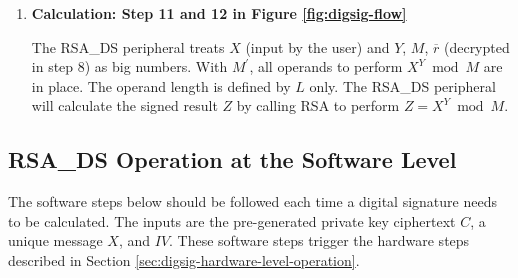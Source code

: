 \documentclass[main\_\_EN.tex]{subfiles}
\begin{document}
\begin{enumerate}
\begin{itemize}
        \end{itemize}

        The RSA\_DS peripheral will only perform subsequent operations if MD check passes. If the padding check fails, a warning is generated, but it does not affect the subsequent operations.

    \item {\bfseries Calculation: Step 11 and 12 in Figure \ref{fig:digsig-flow}}

        The RSA\_DS peripheral treats \begin{math}X\end{math} (input by the user) and \begin{math}Y\end{math}, \begin{math}M\end{math}, \begin{math}\overline{r}\end{math} (decrypted in step 8) as big numbers. With \begin{math}M^{\prime}\end{math}, all operands to perform \begin{math} X^{Y} \bmod M\end{math} are in place. The operand length is defined by \begin{math}L\end{math} only. The RSA\_DS peripheral will calculate the signed result \begin{math}Z\end{math} by calling RSA to perform \begin{math}Z = X^{Y} \bmod M\end{math}.

\end{enumerate}

\subsection{RSA\_DS Operation at the Software Level}

The software steps below should be followed each time a digital signature needs to be calculated. The inputs are the pre-generated private key ciphertext \begin{math}C\end{math}, a unique message \begin{math}X\end{math}, and \begin{math}IV\end{math}. These software steps trigger the hardware steps described in Section \ref{sec:digsig-hardware-level-operation}.
\end{document}
